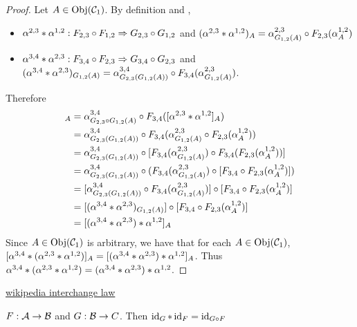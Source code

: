\documentclass{book}
\begin{document}
	\begin{proof}
		Let $A \in \operatorname{Obj}(\mathcal{C}_1)$. By definition and , 
		\begin{itemize}
			\item $\alpha^{2,3} * \alpha^{1,2}: F_{2,3} \circ F_{1,2} \Rightarrow G_{2,3} \circ G_{1,2}$ and $(\alpha^{2,3} * \alpha^{1,2})_A = \alpha^{2,3}_{G_{1,2}(A)} \circ F_{2,3}(\alpha^{1,2}_A)$
			\item $\alpha^{3,4} * \alpha^{2,3}: F_{3,4} \circ F_{2,3} \Rightarrow G_{3,4} \circ G_{2,3}$ and $(\alpha^{3,4} * \alpha^{2,3})_{G_{1,2}(A)} = \alpha^{3,4}_{G_{2,3}(G_{1,2}(A))} \circ F_{3,4}(\alpha^{2,3}_{G_{1,2}(A)})$.
		\end{itemize} 
		Therefore 
		\begin{align*}
			[\al^{3,4} * (\al^{2,3} * \al^{1,2})]_A
			& = \al^{3,4}_{G_{2,3} \circ G_{1,2}(A)} \circ F_{3,4}([\al^{2,3} * \al^{1,2}]_A) \\
			& = \al^{3,4}_{G_{2,3}(G_{1,2}(A))} \circ F_{3,4}(\al^{2,3}_{G_{1,2}(A)} \circ F_{2,3}(\al^{1,2}_A)) \\
			& = \al^{3,4}_{G_{2,3}(G_{1,2}(A))} \circ [F_{3,4}(\al^{2,3}_{G_{1,2}(A)}) \circ F_{3,4}( F_{2,3}(\al^{1,2}_A))] \\
			& = \al^{3,4}_{G_{2,3}(G_{1,2}(A))} \circ (F_{3,4}(\al^{2,3}_{G_{1,2}(A)}) \circ [F_{3,4} \circ F_{2,3}(\al^{1,2}_A)]) \\
			& = [\al^{3,4}_{G_{2,3}(G_{1,2}(A))} \circ F_{3,4}(\al^{2,3}_{G_{1,2}(A)})] \circ  [F_{3,4} \circ F_{2,3}(\al^{1,2}_A)] \\
			& = [(\al^{3,4} * \al^{2,3})_{G_{1,2}(A)}] \circ [F_{3,4} \circ F_{2,3}(\al^{1,2}_A)] \\
			& = [(\al^{3,4} * \al^{2,3}) * \al^{1,2}]_A 
		\end{align*} 
		Since $A \in \operatorname{Obj}(\mathcal{C}_1)$ is arbitrary, we have that for each $A \in \operatorname{Obj}(\mathcal{C}_1)$, $[\alpha^{3,4} * (\alpha^{2,3} * \alpha^{1,2})]_A = [(\alpha^{3,4} * \alpha^{2,3}) * \alpha^{1,2}]_A$. Thus $\alpha^{3,4} * (\alpha^{2,3} * \alpha^{1,2}) = (\alpha^{3,4} * \alpha^{2,3}) * \alpha^{1,2}$.
	\end{proof}
	
	\begin{ex} 
		
		
		\href{https://en.wikipedia.org/wiki/Natural_transformation#Interchange_law}{wikipedia interchange law}
		
	\end{ex}
	
	\begin{ex}
		$F: \mathcal{A} \rightarrow \mathcal{B}$ and $G: \mathcal{B} \rightarrow C$. Then $\operatorname{id}_G * \operatorname{id}_F = \operatorname{id}_{G \circ F}$
	\end{ex}
	
\end{document}
